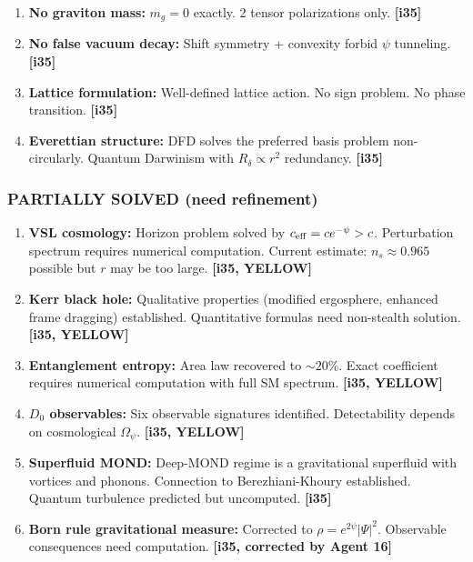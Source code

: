 \documentclass[11pt,a4paper]{article}
\begin{document}
\begin{enumerate}
\item \textbf{No graviton mass:} $m_g = 0$ exactly. 2 tensor polarizations only. \textbf{[i35]}

\item \textbf{No false vacuum decay:} Shift symmetry + convexity forbid $\psi$ tunneling. \textbf{[i35]}

\item \textbf{Lattice formulation:} Well-defined lattice action. No sign problem. No phase transition. \textbf{[i35]}

\item \textbf{Everettian structure:} DFD solves the preferred basis problem non-circularly. Quantum Darwinism with $R_\delta \propto r^2$ redundancy. \textbf{[i35]}
\end{enumerate}

\subsubsection{PARTIALLY SOLVED (need refinement)}

\begin{enumerate}
\item \textbf{VSL cosmology:} Horizon problem solved by $c_{\rm eff} = ce^{-\psi} > c$. Perturbation spectrum requires numerical computation. Current estimate: $n_s \approx 0.965$ possible but $r$ may be too large. \textbf{[i35, YELLOW]}

\item \textbf{Kerr black hole:} Qualitative properties (modified ergosphere, enhanced frame dragging) established. Quantitative formulas need non-stealth solution. \textbf{[i35, YELLOW]}

\item \textbf{Entanglement entropy:} Area law recovered to $\sim 20\%$. Exact coefficient requires numerical computation with full SM spectrum. \textbf{[i35, YELLOW]}

\item \textbf{$D_0$ observables:} Six observable signatures identified. Detectability depends on cosmological $\Omega_\psi$. \textbf{[i35, YELLOW]}

\item \textbf{Superfluid MOND:} Deep-MOND regime is a gravitational superfluid with vortices and phonons. Connection to Berezhiani-Khoury established. Quantum turbulence predicted but uncomputed. \textbf{[i35]}

\item \textbf{Born rule gravitational measure:} Corrected to $\rho = e^{2\psi}|\Psi|^2$. Observable consequences need computation. \textbf{[i35, corrected by Agent 16]}
\end{enumerate}
\end{document}
